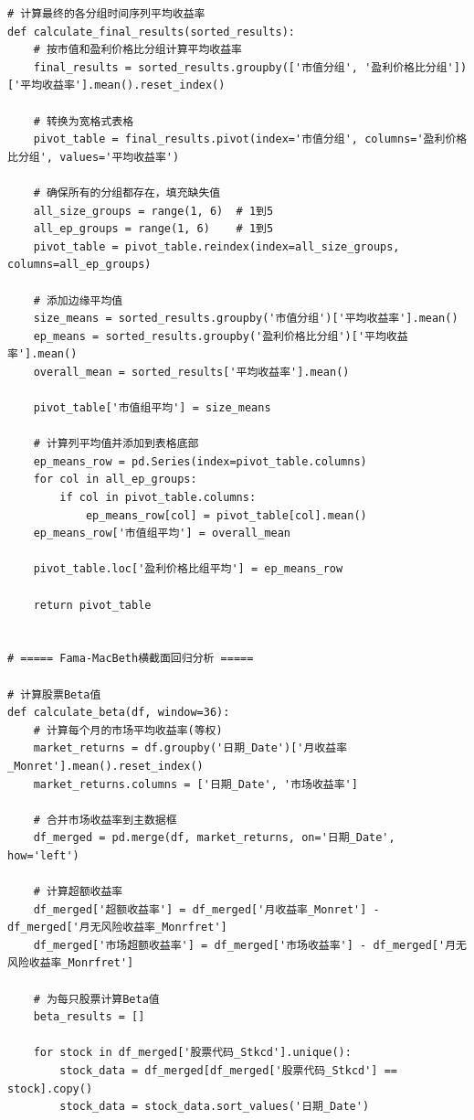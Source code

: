 \documentclass[12pt, a4paper]{article}
\begin{document}
\begin{lstlisting}[basicstyle=\small\ttfamily, breaklines=true, columns=fullflexible]
# 计算最终的各分组时间序列平均收益率
def calculate_final_results(sorted_results):
    # 按市值和盈利价格比分组计算平均收益率
    final_results = sorted_results.groupby(['市值分组', '盈利价格比分组'])['平均收益率'].mean().reset_index()
    
    # 转换为宽格式表格
    pivot_table = final_results.pivot(index='市值分组', columns='盈利价格比分组', values='平均收益率')
    
    # 确保所有的分组都存在，填充缺失值
    all_size_groups = range(1, 6)  # 1到5
    all_ep_groups = range(1, 6)    # 1到5
    pivot_table = pivot_table.reindex(index=all_size_groups, columns=all_ep_groups)
    
    # 添加边缘平均值
    size_means = sorted_results.groupby('市值分组')['平均收益率'].mean()
    ep_means = sorted_results.groupby('盈利价格比分组')['平均收益率'].mean()
    overall_mean = sorted_results['平均收益率'].mean()
    
    pivot_table['市值组平均'] = size_means
    
    # 计算列平均值并添加到表格底部
    ep_means_row = pd.Series(index=pivot_table.columns)
    for col in all_ep_groups:
        if col in pivot_table.columns:
            ep_means_row[col] = pivot_table[col].mean()
    ep_means_row['市值组平均'] = overall_mean
    
    pivot_table.loc['盈利价格比组平均'] = ep_means_row
    
    return pivot_table


# ===== Fama-MacBeth横截面回归分析 =====

# 计算股票Beta值
def calculate_beta(df, window=36):
    # 计算每个月的市场平均收益率(等权)
    market_returns = df.groupby('日期_Date')['月收益率_Monret'].mean().reset_index()
    market_returns.columns = ['日期_Date', '市场收益率']
    
    # 合并市场收益率到主数据框
    df_merged = pd.merge(df, market_returns, on='日期_Date', how='left')
    
    # 计算超额收益率
    df_merged['超额收益率'] = df_merged['月收益率_Monret'] - df_merged['月无风险收益率_Monrfret']
    df_merged['市场超额收益率'] = df_merged['市场收益率'] - df_merged['月无风险收益率_Monrfret']
    
    # 为每只股票计算Beta值
    beta_results = []
    
    for stock in df_merged['股票代码_Stkcd'].unique():
        stock_data = df_merged[df_merged['股票代码_Stkcd'] == stock].copy()
        stock_data = stock_data.sort_values('日期_Date')
        

\end{lstlisting}
\end{document}
